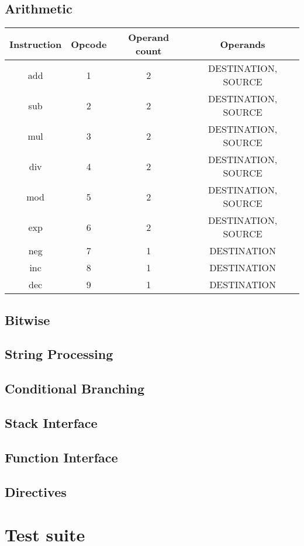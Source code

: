 \documentclass[manuscript,screen,nonacm]{acmart}
\begin{document}
\subsection{Arithmetic}
\begin{center}
\begin{tabular}{|c|c|c|c|}
    \hline
    Instruction & Opcode & Operand count & Operands \\
    \hline
    add & 1 & 2 & DESTINATION, SOURCE \\
    sub & 2 & 2 & DESTINATION, SOURCE \\
    mul & 3 & 2 & DESTINATION, SOURCE \\
    div & 4 & 2 & DESTINATION, SOURCE \\
    mod & 5 & 2 & DESTINATION, SOURCE \\
    exp & 6 & 2 & DESTINATION, SOURCE \\
    neg & 7 & 1 & DESTINATION \\
    inc & 8 & 1 & DESTINATION \\
    dec & 9 & 1 & DESTINATION \\
    \hline
\end{tabular}
\end{center}

\subsection{Bitwise}
\subsection{String Processing}
\subsection{Conditional Branching}
\subsection{Stack Interface}
\subsection{Function Interface}
\subsection{Directives}

\section{Test suite}
\end{document}
